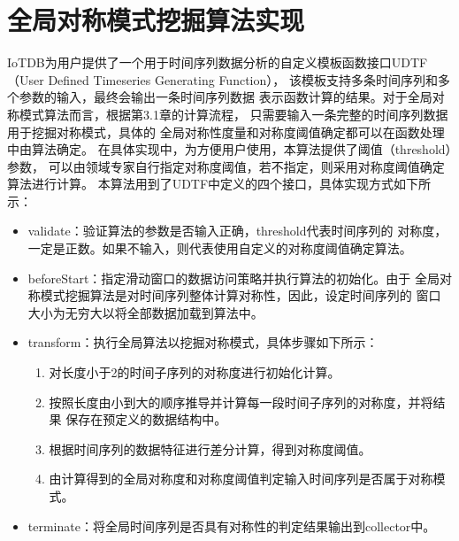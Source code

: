 \section{全局对称模式挖掘算法实现}
IoTDB为用户提供了一个用于时间序列数据分析的自定义模板函数接口UDTF
（User Defined Timeseries Generating Function），
该模板支持多条时间序列和多个参数的输入，最终会输出一条时间序列数据
表示函数计算的结果。对于全局对称模式算法而言，根据第3.1章的计算流程，
只需要输入一条完整的时间序列数据用于挖掘对称模式，具体的
全局对称性度量和对称度阈值确定都可以在函数处理中由算法确定。
在具体实现中，为方便用户使用，本算法提供了阈值（threshold）参数，
可以由领域专家自行指定对称度阈值，若不指定，则采用对称度阈值确定算法进行计算。
本算法用到了UDTF中定义的四个接口，具体实现方式如下所示：
\begin{itemize}
\item validate：验证算法的参数是否输入正确，threshold代表时间序列的
      对称度，一定是正数。如果不输入，则代表使用自定义的对称度阈值确定算法。
\item beforeStart：指定滑动窗口的数据访问策略并执行算法的初始化。由于
      全局对称模式挖掘算法是对时间序列整体计算对称性，因此，设定时间序列的
      窗口大小为无穷大以将全部数据加载到算法中。
\item transform：执行全局算法以挖掘对称模式，具体步骤如下所示：
    \begin{enumerate}
        \item 对长度小于2的时间子序列的对称度进行初始化计算。
        \item 按照长度由小到大的顺序推导并计算每一段时间子序列的对称度，并将结果
              保存在预定义的数据结构中。
        \item 根据时间序列的数据特征进行差分计算，得到对称度阈值。
        \item 由计算得到的全局对称度和对称度阈值判定输入时间序列是否属于对称模式。
    \end{enumerate}
\item terminate：将全局时间序列是否具有对称性的判定结果输出到collector中。
    
\end{itemize}

